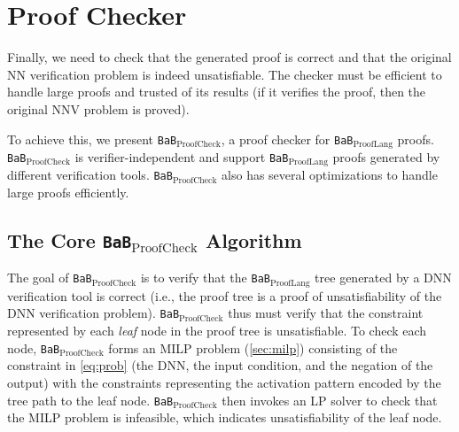\documentclass[oneside,11pt,dvipsnames]{book}
\newcommand{\prooflang}{\texttt{BaB$_{\text{ProofLang}}$}}
\newcommand{\proofcheck}{\texttt{BaB$_{\text{ProofCheck}}$}}
\begin{document}
\section{Proof Checker}\label{sec:proofchecking}
Finally, we need to check that the generated proof is correct and that the original NN verification problem is indeed unsatisfiable. The checker must be efficient to handle large proofs and trusted of its results (if it verifies the proof, then the original NNV problem is proved).


To achieve this, we present \proofcheck{}, a proof checker for \prooflang{} proofs.
\proofcheck{} is verifier-independent and support \prooflang{} proofs generated by different verification tools. \proofcheck{} also has several optimizations to handle large proofs efficiently.

\subsection{The Core \proofcheck{} Algorithm}


The goal of \proofcheck{} is to verify that the \prooflang{} tree generated by a DNN verification tool is correct (i.e., the proof tree is a proof of unsatisfiability of the DNN verification problem).
\proofcheck{} thus must verify that the constraint represented by each \emph{leaf} node in the proof tree is unsatisfiable. To check each node, \proofcheck{} forms an MILP problem (\autoref{sec:milp}) consisting of the constraint in \autoref{eq:prob} (the DNN, the input condition, and the negation of the output) with the constraints representing the activation pattern encoded by the tree path to the leaf node. \proofcheck{} then invokes an LP solver to check that the MILP problem is infeasible, which indicates unsatisfiability of the leaf node. 
\end{document}
